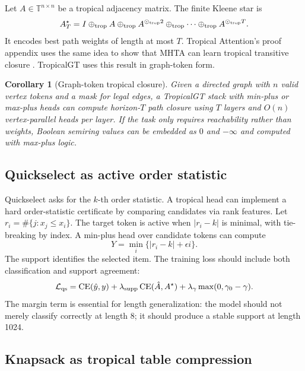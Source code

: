\documentclass[11pt]{article}
\newtheorem{corollary}[definition]{Corollary}
\newcommand{\T}{\mathbb{T}}
\newcommand{\calL}{\mathcal{L}}
\newcommand{\oplusT}{\oplus_{\rm trop}}
\newcommand{\odotT}{\odot_{\rm trop}}
\begin{document}
Let \(A\in\T^{n\times n}\) be a tropical adjacency matrix.  The finite Kleene star is
\begin{equation}
A^{\star}_{T}=I\oplusT A\oplusT A^{\odotT2}\oplusT\cdots\oplusT A^{\odotT T}.
\end{equation}
It encodes best path weights of length at most \(T\).  Tropical Attention's proof appendix uses the same idea to show that MHTA can learn tropical transitive closure \cite{hashemi2025tropical}.  TropicalGT uses this result in graph-token form.

\begin{corollary}[Graph-token tropical closure]
Given a directed graph with \(n\) valid vertex tokens and a mask for legal edges, a TropicalGT stack with min-plus or max-plus heads can compute horizon-\(T\) path closure using \(T\) layers and \(O(n)\) vertex-parallel heads per layer.  If the task only requires reachability rather than weights, Boolean semiring values can be embedded as \(0\) and \(-\infty\) and computed with max-plus logic.
\end{corollary}

\subsection{Quickselect as active order statistic}

Quickselect asks for the \(k\)-th order statistic.  A tropical head can implement a hard order-statistic certificate by comparing candidates via rank features.  Let \(r_i=\#\{j:x_j\le x_i\}\).  The target token is active when \(|r_i-k|\) is minimal, with tie-breaking by index.  A min-plus head over candidate tokens can compute
\begin{equation}
Y=\min_i\{|r_i-k|+\epsilon i\}.
\end{equation}
The support identifies the selected item.  The training loss should include both classification and support agreement:
\begin{equation}
\calL_{\rm qs}=\operatorname{CE}(\hat y,y)+\lambda_{\rm supp}\operatorname{CE}(\hat A,A^\star)+\lambda_\gamma\max(0,\gamma_0-\gamma).
\end{equation}
The margin term is essential for length generalization: the model should not merely classify correctly at length 8; it should produce a stable support at length 1024.

\subsection{Knapsack as tropical table compression}
\end{document}

